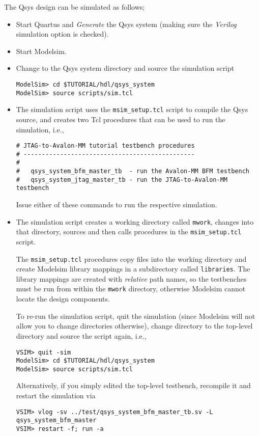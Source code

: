 \documentclass[10pt,twoside]{article}
\begin{document}
The Qsys design can be simulated as follows;
%
\begin{itemize}
\item Start Quartus and {\em Generate} the Qsys system
(making sure the {\em Verilog} simulation option is checked).
\item Start Modelsim.
\item Change to the Qsys system directory and source the
simulation script
%
\begin{verbatim}
ModelSim> cd $TUTORIAL/hdl/qsys_system
ModelSim> source scripts/sim.tcl
\end{verbatim}
%
\item The simulation script uses the \verb+msim_setup.tcl+
script to compile the Qsys source, and creates two Tcl procedures
that can be used to run the simulation, i.e.,
%
\begin{verbatim}
# JTAG-to-Avalon-MM tutorial testbench procedures 
# ----------------------------------------------- 
#  
#   qsys_system_bfm_master_tb  - run the Avalon-MM BFM testbench 
#   qsys_system_jtag_master_tb - run the JTAG-to-Avalon-MM testbench 
\end{verbatim}
%
Issue either of these commands to run the respective simulation.

\item The simulation script creates a working directory called
\verb+mwork+, changes into that directory, sources and then calls
procedures in the \verb+msim_setup.tcl+ script. 

The \verb+msim_setup.tcl+ procedures copy files into the working
directory and create Modelsim library mappings in a subdirectory
called \verb+libraries+\label{bug:9}.
The library mappings are created with
{\em relative} path names, so the testbenches must be run from 
within the \verb+mwork+ directory, otherwise Modelsim cannot locate
the design components. 

To re-run the simulation script, quit the simulation (since Modelsim
will not allow you to change directories otherwise), change directory
to the top-level directory and source the script again, i.e.,
%
\begin{verbatim}
VSIM> quit -sim
ModelSim> cd $TUTORIAL/hdl/qsys_system
ModelSim> source scripts/sim.tcl
\end{verbatim}
%
Alternatively, if you simply edited the top-level testbench, recompile
it and restart the simulation via
%
\begin{verbatim}
VSIM> vlog -sv ../test/qsys_system_bfm_master_tb.sv -L qsys_system_bfm_master
VSIM> restart -f; run -a
\end{verbatim}
%
\end{itemize}
\end{document}
